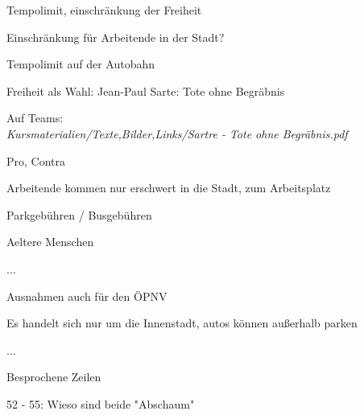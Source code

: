 \startmode[single]
\startchapter[title={2024-11-18 - WuN}]
\stopmode

\startmode[multiple]
\startsection[title={2024-11-18}]
\stopmode


\startitemize[packed,m]
\item Tempolimit, einschränkung der Freiheit
\item Einschränkung für Arbeitende in der Stadt?
\item Tempolimit auf der Autobahn
\item Freiheit als Wahl: Jean-Paul Sarte: Tote ohne Begräbnis
\startitemize[packed]
\item Auf Teams:\\ {\em Kursmaterialien/Texte,Bilder,Links/Sartre - Tote ohne Begräbnis.pdf}
\stopitemize
\stopitemize
\stopframedtext

\startsectionlevel[title={Einschränkung für Arbeitende in der Stadt}]

\startplacetable[location={here},title={Vergleich}]
\setupTABLE[r][1][background=color,backgroundcolor=gray]
\bTABLE
\startCSV
Pro, Contra
\stopCSV
\bTR
\bTD
\startitemize[packed]
\item Arbeitende kommen nur erschwert in die Stadt, zum Arbeitsplatz
\item Parkgebühren / Busgebühren
\item Aeltere Menschen
\item ...
\stopitemize
\eTD
\bTD
\startitemize[packed]
\item Ausnahmen auch für den ÖPNV
\item Es handelt sich nur um die Innenstadt, autos können außerhalb parken
\item ...
\stopitemize
\eTD
\eTR
\eTABLE
\stopplacetable

\stopsectionlevel
\startsectionlevel[title={Freiheit als Wahl}]

Besprochene Zeilen
\startitemize[packed]
\item 52 - 55: Wieso sind beide "Abschaum"
\item 
\stopitemize

\stopsectionlevel
\startmode[single]
\stopchapter
\stopmode

\startmode[multiple]
\stopsection
\stopmode

\stopchapter
